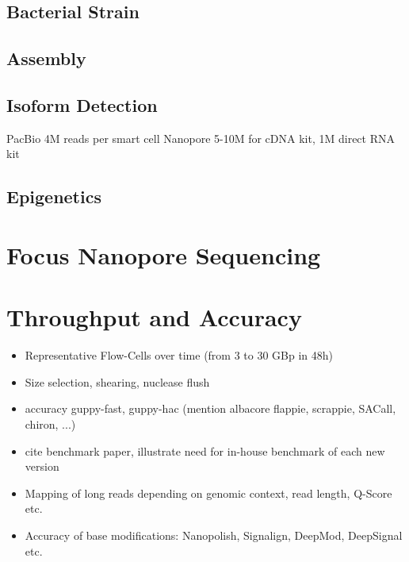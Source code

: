 \subsection{Bacterial Strain}
\label{subsec:state_of_art:strain}

\subsection{Assembly}
\label{subsec:state_of_art:assembly}

\subsection{Isoform Detection}
\label{subsec:state_of_art:isoform}

PacBio 4M reads per smart cell
Nanopore 5-10M for cDNA kit, 1M direct RNA kit

\subsection{Epigenetics}
\label{subsec:state_of_art:epigenetics}




\section{Focus Nanopore Sequencing}
\label{sec:state_of_art:nanopore}








\section{Throughput and Accuracy}
\label{sec:stat_of_art:throughput}

\begin{itemize}
    \item Representative Flow-Cells over time (from 3 to 30 GBp in 48h)
    \item Size selection, shearing, nuclease flush
    \item accuracy guppy-fast, guppy-hac (mention albacore flappie, scrappie, SACall, chiron, ...)
    \item cite benchmark paper, illustrate need for in-house benchmark of each new version
    \item Mapping of long reads depending on genomic context, read length, Q-Score etc.
    \item Accuracy of base modifications: Nanopolish, Signalign, DeepMod, DeepSignal etc.
\end{itemize}

